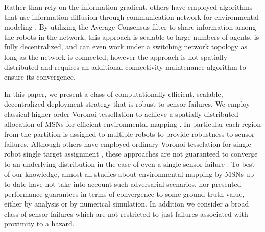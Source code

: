 \documentclass[letterpaper, 10 pt, conference]{ieeeconf}
\newcommand{\Ram}[1]{{\normalsize{\textbf{({\color{green}Ram:\ }#1)}}}}
\begin{document}
Rather than rely on the information gradient, others have employed algorithms that use information diffusion through communication network for environmental modeling \cite{lynch2008decentralized}.  
By utilizing the Average Consensus filter to share information among the robots in the network, this approach is scalable to large numbers of agents, is fully decentralized, and can even work under a switching network topology as long as the network is connected; however the approach is not spatially distributed and requires an additional connectivity maintenance algorithm \cite{yang2010decentralized} to ensure its convergence.


%





In this paper, we present a class of computationally efficient, scalable, decentralized deployment strategy that is robust to sensor failures. 
We employ classical higher order Voronoi tessellation to achieve a spatially distributed allocation of MSNs for efficient environmental mapping \cite{shamos1975closest}.
In particular each region from the partition is assigned to multiple robots to provide robustness to sensor failures.
Although others have employed ordinary Voronoi tesselation for single robot single target assignment \cite{cortez2011information}, these approaches are not guaranteed to converge to an underlying distribution in the case of even a single sensor failure \cite{hutchinson_robust_2012}.
To best of our knowledge, almost all studies about environmental mapping by MSNs up to date have not take into account such adversarial scenarios, nor presented performance guarantees in terms of convergence to some ground truth value, either by analysis or by numerical simulation.
In addition we consider a broad class of sensor failures which are not restricted to just failures associated with proximity to a hazard.
\end{document}
